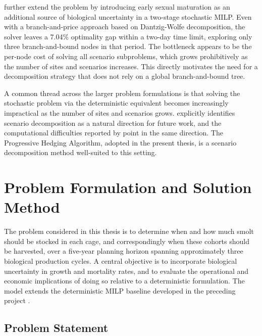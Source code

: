 \documentclass[12pt,a4paper]{article}
\begin{document}
\citet{lien2022} further extend the problem by introducing early sexual maturation as an additional source of biological uncertainty in a two-stage stochastic MILP. Even with a branch-and-price approach based on Dantzig-Wolfe decomposition, the solver leaves a 7.04\% optimality gap within a two-day time limit, exploring only three branch-and-bound nodes in that period. The bottleneck appears to be the per-node cost of solving all scenario subproblems, which grows prohibitively as the number of sites and scenarios increases. This directly motivates the need for a decomposition strategy that does not rely on a global branch-and-bound tree.
 
A common thread across the larger problem formulations is that solving the stochastic problem via the deterministic equivalent becomes increasingly impractical as the number of sites and scenarios grows. \citet{naess2019} explicitly identifies scenario decomposition as a natural direction for future work, and the computational difficulties reported by \citet{lien2022} point in the same direction. The Progressive Hedging Algorithm, adopted in the present thesis, is a scenario decomposition method well-suited to this setting.
 
 
\section{Problem Formulation and Solution Method}
 
The problem considered in this thesis is to determine when and how much smolt should be stocked in each cage, and correspondingly when these cohorts should be harvested, over a five-year planning horizon spanning approximately three biological production cycles. A central objective is to incorporate biological uncertainty in growth and mortality rates, and to evaluate the operational and economic implications of doing so relative to a deterministic formulation. The model extends the deterministic MILP baseline developed in the preceding project \citep{ErikstadHaugland2025}.
 
\subsection{Problem Statement}
 
\end{document}
